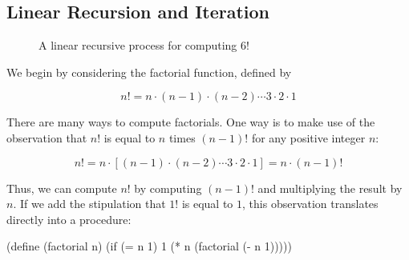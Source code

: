 \subsection{Linear Recursion and Iteration}
\label{sec:1.2.1}

\begin{figure}
  \centering
  \caption{A linear recursive process for computing $6!$}
  \label{fig:1.3}
\end{figure}

We begin by considering the factorial function, defined by

\begin{displaymath}
n! = n \cdot (n-1) \cdot (n-2) \cdots 3 \cdot 2 \cdot 1
\end{displaymath}

There are many ways to compute factorials.  One way is to make use of
the observation that $n!$ is equal to $n$ times $(n - 1)!$ for
any positive integer $n$:


\begin{displaymath}
n! = n \cdot \left[ (n-1) \cdot (n-2) \cdots 3 \cdot 2 \cdot 1 \right] = n \cdot (n-1)!
\end{displaymath}

Thus, we can compute $n!$ by computing $(n - 1)!$ and multiplying the
result by $n$.  If we add the stipulation that $1!$ is equal to $1$,
this observation translates directly into a procedure:

\begin{schemedisplay}
(define (factorial n)
  (if (= n 1)
      1
      (* n (factorial (- n 1)))))
\end{schemedisplay}

